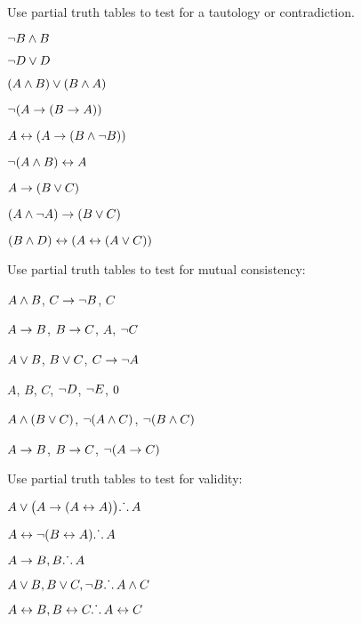 \documentclass[PHIL101-Textbook.tex]{subfiles}
\begin{document}
\noindent\problempart
\label{pr.TT.TTorC2}
Use partial truth tables to test for a tautology or contradiction. 
\begin{earg}
\item $\neg B \land B$ %
\item $\neg D \vee D$ %
\item $(A\land B) \vee (B\land A)$ %
\item $\neg(A \rightarrow (B \rightarrow A))$ %
\item $A \leftrightarrow (A \rightarrow (B \land \neg B))$ %
\item $\neg(A\land B) \leftrightarrow A$ %
\item $A\rightarrow(B\vee C)$ %
\item $(A \land\neg A) \rightarrow (B \vee C)$ %
\item $(B\land D) \leftrightarrow (A \leftrightarrow(A \vee C))$%
\end{earg}


\noindent
\problempart
\label{pr.TT.consistent4}
Use partial truth tables to test for mutual consistency:
\begin{earg}
\item $A \land B$, $C\rightarrow \neg B$, $C$ %
\item $A\rightarrow B$, $B\rightarrow C$, $A$, $\neg C$ %
\item $A \vee B$, $B\vee C$, $C\rightarrow \neg A$ %
\item $A$, $B$, $C$, $\neg D$, $\neg E$, $ 0$ %
\item $A \land (B \vee C)$, $\neg(A \land C)$, $\neg(B \land C)$ %
\item $A \rightarrow B$, $B \rightarrow C$, $\neg(A \rightarrow C)$ %
\end{earg}

\noindent\solutions
\problempart
\label{pr.TT.valid4}
Use partial truth tables to test for validity:
\begin{earg}
\item $A\vee\bigl(A\rightarrow(A\leftrightarrow A)\bigr) \ldotp\dot{}\,\ldotp A$ %
\item $A\leftrightarrow\neg(B\leftrightarrow A) \ldotp\dot{}\,\ldotp A$ %
\item $A\rightarrow B, B \ldotp\dot{}\,\ldotp A$ %
\item $A\vee B, B\vee C, \neg B \ldotp\dot{}\,\ldotp A \land C$ %
\item $A\leftrightarrow B, B\leftrightarrow C \ldotp\dot{}\,\ldotp A\leftrightarrow C$ %
\end{earg}

\pagebreak
\end{document}
